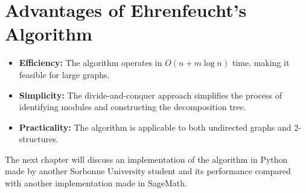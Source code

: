 \section{Advantages of Ehrenfeucht's Algorithm}\label{sec:advantages-of-ehrenfeucht's-algorithm}

\begin{itemize}
    \item \textbf{Efficiency:} The algorithm operates in $O(n + m\log{n})$ time, making it feasible for large graphs.
    \item \textbf{Simplicity:} The divide-and-conquer approach simplifies the process of identifying modules and constructing the decomposition tree.
    \item \textbf{Practicality:} The algorithm is applicable to both undirected graphs and 2-structures.
\end{itemize}


\hspace{4cm}

The next chapter will discuss an implementation of the algorithm in Python made by another Sorbonne University student and its performance compared with another implementation made in SageMath.
